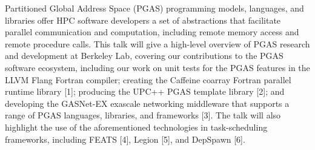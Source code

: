 Partitioned Global Address Space (PGAS) programming models, languages, and libraries offer HPC software developers a set of abstractions that facilitate parallel communication and computation, including remote memory access and remote procedure calls. This talk will give a high-level overview of PGAS research and development at Berkeley Lab, covering our contributions to the PGAS software ecosystem, including our work on unit tests for the PGAS features in the LLVM Flang Fortran compiler; creating the Caffeine coarray Fortran parallel runtime library [1]; producing the UPC++ PGAS template library [2]; and developing the GASNet-EX exascale networking middleware that supports a range of PGAS languages, libraries, and frameworks [3]. The talk will also highlight the use of the aforementioned technologies in task-scheduling frameworks, including FEATS [4], Legion [5], and DepSpawn [6]. 